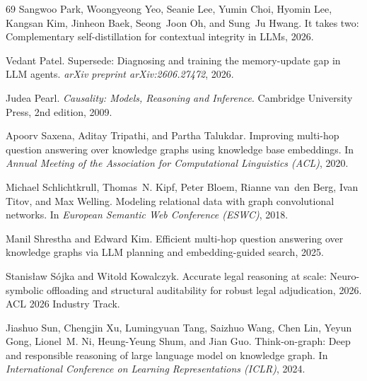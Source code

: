 \documentclass[11pt]{article}
\theoremstyle{plain}
\begin{document}
{\begin{thebibliography}{69}
Sangwoo Park, Woongyeong Yeo, Seanie Lee, Yumin Choi, Hyomin Lee, Kangsan Kim,
  Jinheon Baek, Seong~Joon Oh, and Sung~Ju Hwang.
\newblock It takes two: Complementary self-distillation for contextual
  integrity in {LLM}s, 2026.

Vedant Patel.
\newblock Supersede: Diagnosing and training the memory-update gap in {LLM}
  agents.
\newblock \emph{arXiv preprint arXiv:2606.27472}, 2026.

Judea Pearl.
\newblock \emph{Causality: Models, Reasoning and Inference}.
\newblock Cambridge University Press, 2nd edition, 2009.

Apoorv Saxena, Aditay Tripathi, and Partha Talukdar.
\newblock Improving multi-hop question answering over knowledge graphs using
  knowledge base embeddings.
\newblock In \emph{Annual Meeting of the Association for Computational
  Linguistics (ACL)}, 2020.

Michael Schlichtkrull, Thomas~N. Kipf, Peter Bloem, Rianne van~den Berg, Ivan
  Titov, and Max Welling.
\newblock Modeling relational data with graph convolutional networks.
\newblock In \emph{European Semantic Web Conference (ESWC)}, 2018.

Manil Shrestha and Edward Kim.
\newblock Efficient multi-hop question answering over knowledge graphs via
  {LLM} planning and embedding-guided search, 2025.

Stanis{\l}aw S{\'o}jka and Witold Kowalczyk.
\newblock Accurate legal reasoning at scale: Neuro-symbolic offloading and
  structural auditability for robust legal adjudication, 2026.
\newblock ACL 2026 Industry Track.

Jiashuo Sun, Chengjin Xu, Lumingyuan Tang, Saizhuo Wang, Chen Lin, Yeyun Gong,
  Lionel~M. Ni, Heung-Yeung Shum, and Jian Guo.
\newblock Think-on-graph: Deep and responsible reasoning of large language
  model on knowledge graph.
\newblock In \emph{International Conference on Learning Representations
  (ICLR)}, 2024.


\end{thebibliography}}
\end{document}
